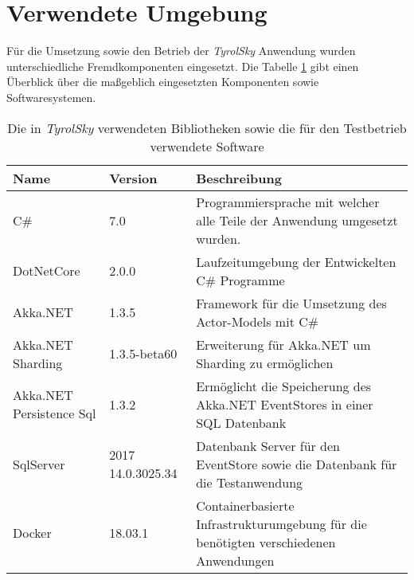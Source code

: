 \section{Verwendete Umgebung}
Für die Umsetzung sowie den Betrieb der \textit{TyrolSky} Anwendung wurden unterschiedliche Fremdkomponenten eingesetzt. Die Tabelle \ref{tab:implementation:EnvironmentVersions} gibt einen Überblick über die maßgeblich eingesetzten Komponenten sowie Softwaresystemen. 

\begin{table}[h]
  \centering
  \begin{tabular}{llp{6.5cm}}
  Name      & Version    & Beschreibung \\ \hline
  C\#     & 7.0        & Programmiersprache mit welcher alle Teile der Anwendung umgesetzt wurden. \\
  DotNetCore   & 2.0.0       & Laufzeitumgebung der Entwickelten C\# Programme \\
  Akka.NET    & 1.3.5       & Framework für die Umsetzung des  Actor-Models mit C\# \\
  Akka.NET Sharding & 1.3.5-beta60  & Erweiterung für Akka.NET um Sharding zu ermöglichen \\
  Akka.NET Persistence Sql & 1.3.2  & Ermöglicht die Speicherung des Akka.NET EventStores in einer SQL Datenbank\\
  SqlServer    & 2017 14.0.3025.34 & Datenbank Server für den EventStore sowie die Datenbank für die Testanwendung\\
  Docker     & 18.03.1      & Containerbasierte Infrastrukturumgebung für die benötigten verschiedenen Anwendungen\\
    \end{tabular}
    \caption{Die in \textit{TyrolSky} verwendeten Bibliotheken sowie die für den Testbetrieb verwendete Software}
    \label{tab:implementation:EnvironmentVersions}
    \end{table}